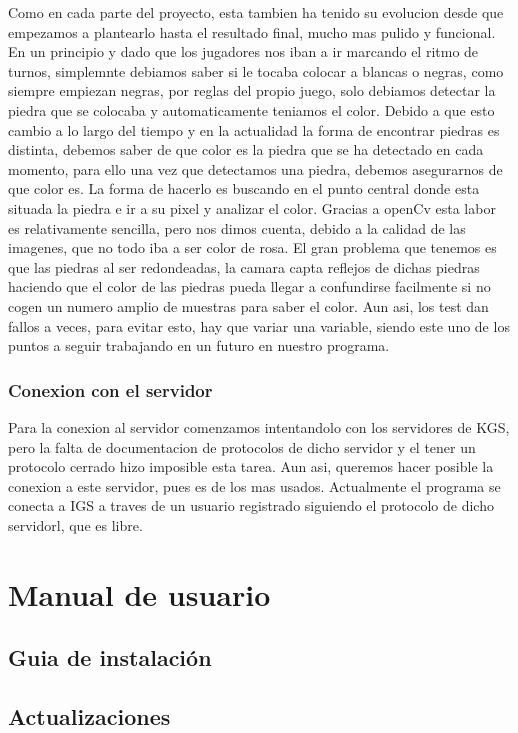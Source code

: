\documentclass[12pt,a4paper]{report}
\begin{document}
Como en cada parte del proyecto, esta tambien ha tenido su evolucion desde que
empezamos a plantearlo hasta el resultado final, mucho mas pulido y funcional.
En un principio y dado que los jugadores nos iban a ir marcando el ritmo de
turnos, simplemnte debiamos saber si le tocaba colocar a blancas o negras, como
siempre empiezan negras, por reglas del propio juego, solo debiamos detectar la
piedra que se colocaba y automaticamente teniamos el color.  Debido a que esto
cambio a lo largo del tiempo y en la actualidad la forma de encontrar piedras es
distinta, debemos saber de que color es la piedra que se ha detectado en cada
momento, para ello una vez que detectamos una piedra, debemos asegurarnos de que
color es. La forma de hacerlo es buscando en el punto central donde esta situada
la piedra e ir a su pixel y analizar el color. Gracias a openCv esta labor es
relativamente sencilla, pero nos dimos cuenta, debido a la calidad de las
imagenes, que no todo iba a ser color de rosa. El gran problema que tenemos es
que las piedras al ser redondeadas, la camara capta reflejos de dichas piedras
haciendo que el color de las piedras pueda llegar a confundirse facilmente si no
cogen un numero amplio de muestras para saber el color. Aun asi, los test dan
fallos a veces, para evitar esto, hay que variar una variable, siendo este uno
de los puntos a seguir trabajando en un futuro en nuestro programa.


\subsection{Conexion con el servidor}

Para la conexion al servidor comenzamos intentandolo con los servidores de KGS,
pero la falta de documentacion de protocolos de dicho servidor y el tener un
protocolo cerrado hizo imposible esta tarea. Aun asi, queremos hacer posible la
conexion a este servidor, pues es de los mas usados. Actualmente el programa se
conecta a IGS a traves de un usuario registrado siguiendo el protocolo de dicho
servidorl, que es libre.


\chapter{Manual de usuario}

\section{Guia de instalación} 
\section{Actualizaciones}
\end{document}
